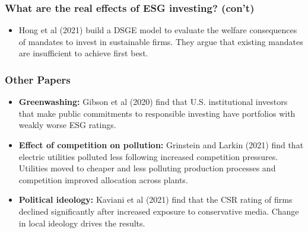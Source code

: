\documentclass{beamer}
\begin{document}
\begin{frame}
\frametitle{What are the real effects of ESG investing? (con't)}
\begin{itemize}
\item Hong et al (2021) build a DSGE model to evaluate the welfare consequences of mandates to invest in sustainable firms. They argue that existing mandates are insufficient to achieve first best.
\end{itemize}
\end{frame}



\begin{frame}
\frametitle{Other Papers}
\begin{itemize}[<+->]
\item \textbf{Greenwashing:} Gibson et al (2020) find that U.S. institutional investors that make public commitments to responsible investing have portfolios with weakly worse ESG ratings.
\bigskip
\item \textbf{Effect of competition on pollution:} Grinstein and Larkin (2021) find that electric utilities polluted less following increased competition pressures. Utilities moved to cheaper and less polluting production processes and competition improved allocation across plants.
\bigskip
\item \textbf{Political ideology:} Kaviani et al (2021) find that the CSR rating of firms declined significantly after increased exposure to conservative media. Change in local ideology drives the results.
\end{itemize}
\end{frame}
\end{document}
